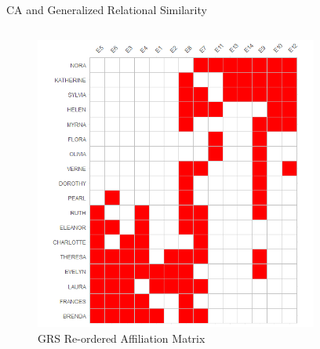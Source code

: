 \documentclass[
  ignorenonframetext,
]{beamer}
\begin{document}
\begin{frame}{CA and Generalized Relational Similarity}
\protect\hypertarget{ca-and-generalized-relational-similarity-5}{}
\begin{columns}[T]
\begin{column}{0.5\textwidth}
\begin{figure}

{\centering \includegraphics{Plots/grs-plot-reord.png}

}

\caption{GRS Re-ordered Affiliation Matrix}

\end{figure}
\end{column}

\begin{column}{0.3\textwidth}
\begin{figure}


\end{figure}
\end{column}
\end{columns}
\end{frame}
\end{document}
